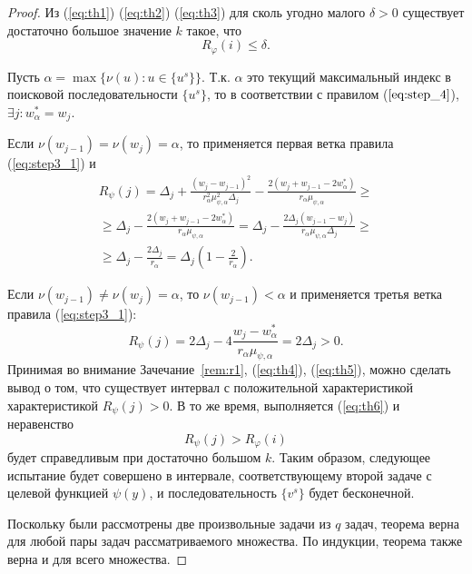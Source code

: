 \begin{proof}
  Из (\ref{eq:th1}) (\ref{eq:th2}) (\ref{eq:th3}) для сколь угодно малого \(\delta > 0\) существует достаточно большое значение \(k\) такое, что
  \begin{equation}
    R_\varphi(i)\leqslant \delta.
    \label{eq:th6}
  \end{equation}

  Пусть \(\alpha = \max\{\nu(u):u\in\{u^s\}\}\). Т.к. \(\alpha\) это текущий максимальный индекс
  в поисковой последовательности \(\{u^s\}\), то в соответствии с правилом (\(\ref{eq:step_4}\)), \(\exists j: w^*_\alpha=w_j\).

  Если \(\nu(w_{j-1})=\nu(w_{j})=\alpha\), то применяется первая ветка правила (\ref{eq:step3_1}) и
  \begin{equation}
    \begin{array}{l}
      R_\psi(j)=\Delta_j + \frac{(w_j-w_{j-1})^2}{r_\alpha^2\mu_{\psi,\alpha}^2\Delta_j}
        - \frac{2(w_j+w_{j-1}-2w^*_\alpha)}{r_\alpha\mu_{\psi,\alpha}} \geqslant \\
        \geqslant\Delta_j - \frac{2(w_j+w_{j-1}-2w^*_\alpha)}{r_\alpha\mu_{\psi,\alpha}} =
        \Delta_j - \frac{2\Delta_j(w_{j-1}-w_j)}{r_\alpha\mu_{\psi,\alpha}\Delta_j} \geqslant\\
        \geqslant \Delta_j - \frac{2\Delta_j}{r_\alpha} = \Delta_j\left(1-\frac{2}{r_\alpha}\right).
      \end{array}
    \label{eq:th4}
  \end{equation}

  Если \(\nu(w_{j-1})\ne\nu(w_{j})=\alpha\), то \(\nu(w_{j-1})<\alpha\) и применяется третья ветка правила (\ref{eq:step3_1}):
  \begin{equation}
    R_\psi(j)=2\Delta_j - 4 \frac{w_j-w^*_{\alpha}}{r_\alpha \mu_{\psi,\alpha}}=2\Delta_j > 0.
    \label{eq:th5}
  \end{equation}
  Принимая во внимание Зачечание~\ref{rem:r1}, (\ref{eq:th4}), (\ref{eq:th5}), можно сделать вывод о том, что
  существует интервал с положительной характеристикой характеристикой \(R_\psi(j)>0\). В то же время, выполняется (\ref{eq:th6})
  и неравенство
  \begin{displaymath}
    R_\psi(j) > R_\varphi(i)
  \end{displaymath}
  будет справедливым при достаточно большом \(k\). Таким образом, следующее испытание будет совершено
  в интервале, соответствующему второй задаче с целевой функцией \(\psi(y)\), и последовательность \(\{v^s\}\) будет бесконечной.

  Поскольку были рассмотрены две произвольные задачи из \(q\) задач, теорема верна для любой пары задач рассматриваемого множества.
  По индукции, теорема также верна и для всего множества.
\end{proof}

